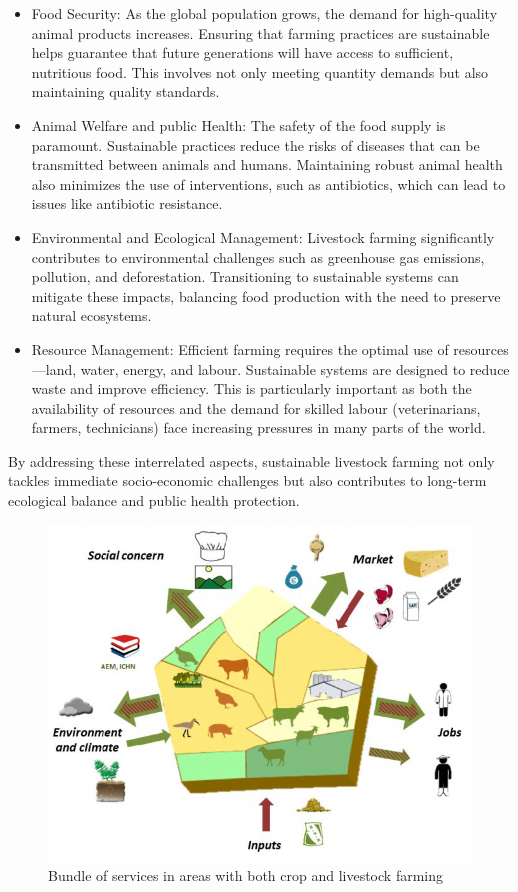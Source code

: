 \begin{itemize}
    \item Food Security: As the global population grows, the demand for high-quality animal products increases. Ensuring that farming practices are sustainable helps guarantee that future generations will have access to sufficient, nutritious food. This involves not only meeting quantity demands but also maintaining quality standards.
    \item Animal Welfare and public Health: The safety of the food supply is paramount. Sustainable practices reduce the risks of diseases that can be transmitted between animals and humans. Maintaining robust animal health also minimizes the use of interventions, such as antibiotics, which can lead to issues like antibiotic resistance.
    \item Environmental and Ecological Management: Livestock farming significantly contributes to environmental challenges such as greenhouse gas emissions, pollution, and deforestation. Transitioning to sustainable systems can mitigate these impacts, balancing food production with the need to preserve natural ecosystems.
    \item Resource Management: Efficient farming requires the optimal use of resources—land, water, energy, and labour. Sustainable systems are designed to reduce waste and improve efficiency. This is particularly important as both the availability of resources and the demand for skilled labour (veterinarians, farmers, technicians) face increasing pressures in many parts of the world.
\end{itemize}

By addressing these interrelated aspects, sustainable livestock farming not only tackles immediate socio-economic challenges but also contributes to long-term ecological balance and public health protection.

\begin{figure}[h]
  \includegraphics[width=\linewidth]{figures/chap1/chap1-livestockfarming.png}
  \caption{Bundle of services in areas with both crop and livestock farming}
  \label{fig:chap1-livestock}
\end{figure}






